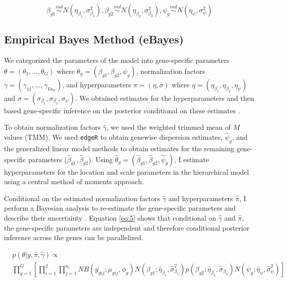 \begin{equation}
\label{eq:4}
\beta_{g1} \stackrel{ind}{\sim} N(\eta_{\beta_1}, \sigma^2_{\beta_1}), \beta_{g2} \stackrel{ind}{\sim} N(\eta_{\beta_2} , \sigma^2_{\beta_2}), \psi_g \stackrel{ind}{\sim} N(\eta_\psi, \sigma^2_\psi)
\end{equation}


\subsection{Empirical Bayes Method (eBayes)}

We categorized the parameters of the model into gene-specific parameters $\theta = (\theta_1, ..., \theta_G)$ where $\theta_g = (\beta_{g1}, \beta_{g2}, \psi_g)$, normalization factors $\gamma = (\gamma_{11}, ..., \gamma_{V n_V})$, and hyperparameters $\pi = (\eta, \sigma)$ where $\eta = (\eta_{\beta_1}, \eta_{\beta_2}, \eta_\psi)$ and $\sigma = (\sigma_{\beta_1}, \sigma_{\beta_2}, \sigma_\psi)$. We obtained estimates for the hyperparameters and then based gene-specific inference on the posterior conditional on these estimates \citep{niemi2015empirical}.

To obtain normalization factors $\hat{\gamma}$, we used the weighted trimmed mean of $M$ values (TMM). We used {\tt edgeR} to obtain genewise dispersion estimates, $\hat{\psi}_g$, and the generalized linear model methods to obtain estimates for the remaining gene-specific parameters ($\hat{\beta}_{g1}, \hat{\beta}_{g2}$)\citep{robinson2010scaling}. Using $\hat{\theta}_g = (\hat{\beta}_{g1} , \hat{\beta}_{g2}, \hat{\psi}_g)$, I estimate hyperparameters for the location and scale parameters in the hierarchical model using a central method of moments approach. 

Conditional on the estimated normalization factors $\hat{\gamma}$ and hyperparameters $\hat{\pi}$, I perform a Bayesian analysis to re-estimate the gene-specific parameters and describe their uncertainty \citep{niemi2015empirical}. Equation \ref{eq:5} shows that conditional on $\hat{\gamma}$ and $\hat{\pi}$, the gene-specific parameters are independent and therefore conditional posterior inference across the genes can be parallelized. 

\begin{equation}
\label{eq:5}
\begin{split}
& p(\theta | y, \hat{\pi}, \hat{\gamma})  \propto \\ & \prod_{g=1}^{G} \left[ \prod_{i=1}^{2} \prod_{j=1}^{n_i} NB(y_{gij} ; \mu_{gij}, \phi_g) N(\beta_{g1} ; \hat{\eta}_{\beta_1}, \hat{\sigma}^2_{\beta_1}) p(\beta_{g2} ; \hat{\eta}_{\beta_2}, \hat{\sigma}_{\beta_2}) N(\psi_g ; \hat{\eta}_{\psi}, \hat{\sigma}^2_{\psi})  \right]
\end{split}
\end{equation}

